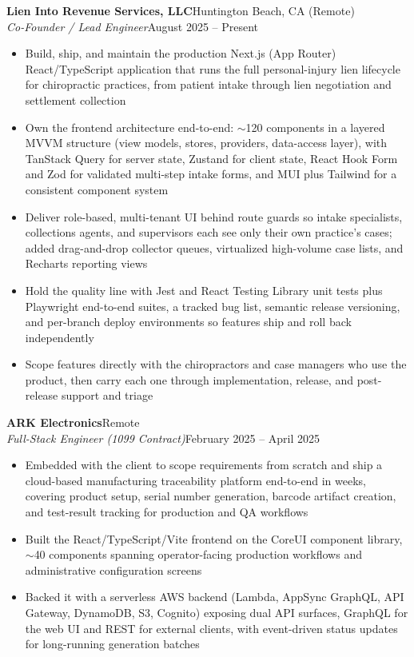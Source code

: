 \documentclass[10.5pt, letterpaper]{article}
\newcommand{\jobentry}[4]{%
  \noindent
  \textbf{\color{accent}#1}\hfill\textcolor{muted}{\small #2}\\
  \textit{#3}\hfill\textcolor{muted}{\small #4}%
}
\begin{document}
\jobentry{Lien Into Revenue Services, LLC}{Huntington Beach, CA (Remote)}{Co-Founder / Lead Engineer}{August 2025 -- Present}
\begin{itemize}
  \item Build, ship, and maintain the production Next.js (App Router) React/TypeScript
        application that runs the full personal-injury lien lifecycle for chiropractic
        practices, from patient intake through lien negotiation and settlement collection
  \item Own the frontend architecture end-to-end: $\sim$120 components in a layered
        MVVM structure (view models, stores, providers, data-access layer), with
        TanStack Query for server state, Zustand for client state, React Hook Form
        and Zod for validated multi-step intake forms, and MUI plus Tailwind for a
        consistent component system
  \item Deliver role-based, multi-tenant UI behind route guards so intake specialists,
        collections agents, and supervisors each see only their own practice's cases;
        added drag-and-drop collector queues, virtualized high-volume case lists, and
        Recharts reporting views
  \item Hold the quality line with Jest and React Testing Library unit tests plus
        Playwright end-to-end suites, a tracked bug list, semantic release versioning,
        and per-branch deploy environments so features ship and roll back independently
  \item Scope features directly with the chiropractors and case managers who use the
        product, then carry each one through implementation, release, and post-release
        support and triage
\end{itemize}

\vspace{5pt}

\jobentry{ARK Electronics}{Remote}{Full-Stack Engineer \normalfont\small(1099 Contract)}{February 2025 -- April 2025}
\begin{itemize}
  \item Embedded with the client to scope requirements from scratch and ship a
        cloud-based manufacturing traceability platform end-to-end in weeks, covering
        product setup, serial number generation, barcode artifact creation, and
        test-result tracking for production and QA workflows
  \item Built the React/TypeScript/Vite frontend on the CoreUI component library,
        $\sim$40 components spanning operator-facing production workflows and
        administrative configuration screens
  \item Backed it with a serverless AWS backend (Lambda, AppSync GraphQL, API Gateway,
        DynamoDB, S3, Cognito) exposing dual API surfaces, GraphQL for the web UI and
        REST for external clients, with event-driven status updates for long-running
        generation batches
\end{itemize}
\end{document}
